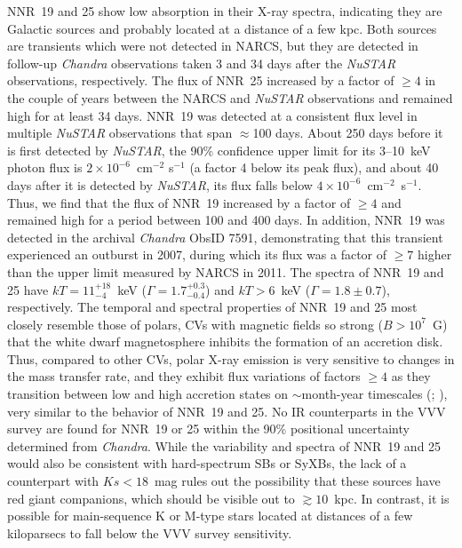 \documentclass[iop,revtex4]{emulateapj}
\begin{document}
NNR~19 and 25 show low absorption in their X-ray spectra, indicating they are Galactic sources and probably located at a distance of a few kpc.  Both sources are transients which were not detected in NARCS, but they are detected in follow-up \textit{Chandra} observations taken 3 and 34 days after the \textit{NuSTAR} observations, respectively.  The flux of NNR~25 increased by a factor of $\geq4$ in the couple of years between the NARCS and \textit{NuSTAR} observations and remained high for at least 34 days.  NNR~19 was detected at a consistent flux level in multiple \textit{NuSTAR} observations that span $\approx$100 days.  About 250 days before it is first detected by \textit{NuSTAR}, the 90\% confidence upper limit for its 3--10~keV photon flux is $2\times10^{-6}$~cm$^{-2}$ s$^{-1}$ (a factor 4 below its peak flux), and about 40 days after it is detected by \textit{NuSTAR}, its flux falls below $4\times10^{-6}$~cm$^{-2}$~s$^{-1}$.  Thus, we find that the flux of NNR~19 increased by a factor of $\geq4$ and remained high for a period between 100 and 400 days.  In addition, NNR~19 was detected in the archival \textit{Chandra} ObsID 7591, demonstrating that this transient experienced an outburst in 2007, during which its flux was a factor of $\geq7$ higher than the upper limit measured by NARCS in 2011.  The spectra of NNR~19 and 25 have $kT=11^{+18}_{-4}$~keV ($\Gamma=1.7^{+0.3}_{-0.4}$) and $kT>6$~keV ($\Gamma=1.8\pm0.7$), respectively.  The temporal and spectral properties of NNR~19 and 25 most closely resemble those of polars, CVs with magnetic fields so strong ($B>10^{7}$~G) that the white dwarf magnetosphere inhibits the formation of an accretion disk.  Thus, compared to other CVs, polar X-ray emission is very sensitive to changes in the mass transfer rate, and they exhibit flux variations of factors $\geq4$  as they transition between low and high accretion states on $\sim$month-year timescales (\citealt{ramsay04}; \citealt{worpel16}), very similar to the behavior of NNR~19 and 25.  No IR counterparts in the VVV survey are found for NNR~19 or 25 within the 90\% positional uncertainty determined from \textit{Chandra}.  While the variability and spectra of NNR~19 and 25 would also be consistent with hard-spectrum SBs or SyXBs, the lack of a counterpart with $Ks<18$~mag rules out the possibility that these sources have red giant companions, which should be visible out to $\gtrsim10$~kpc.  In contrast, it is possible for main-sequence K or M-type stars located at distances of a few kiloparsecs to fall below the VVV survey sensitivity. \par
\end{document}
